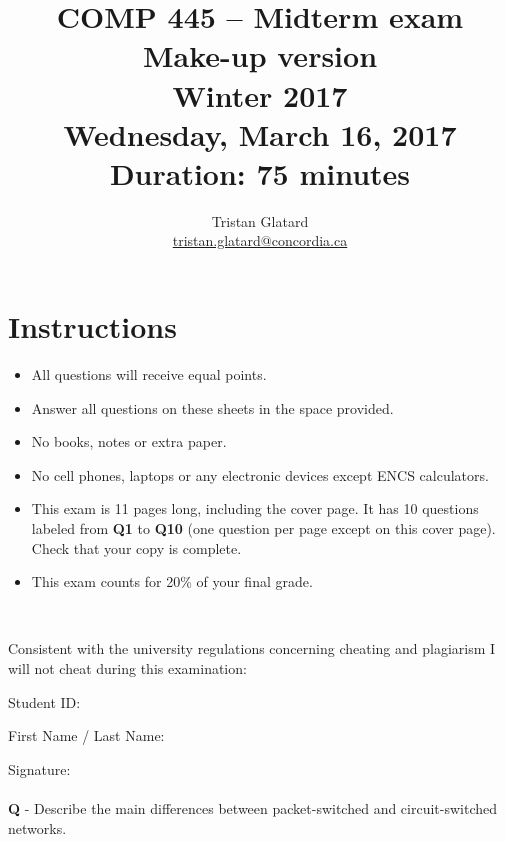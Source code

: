 \documentclass{llncs}
\title{COMP 445 -- Midterm exam \\ Make-up version \\ Winter 2017 \\ Wednesday, March 16, 2017 \\ Duration: 75 minutes}
\author{Tristan Glatard\\
  \href{mailto:tristan.glatard@concordia.ca}{tristan.glatard@concordia.ca}\\
  \vspace*{0.3cm}
  }
\institute{Concordia University\\
  Department of Computer Science and Software Engineering}
\newcounter{ques}
\newcommand{\myspace}[0]{\vspace*{0.25cm}}
\renewcommand{\question}[1]{\paragraph{}\textbf{Q\theques} - #1\stepcounter{ques} }
\newcommand{\answer}[1]{\color{red}\textit{#1}\color{black}}
\begin{document}
\maketitle

\section*{Instructions}
\begin{itemize}
\item All questions will receive equal points.
\item Answer all questions on these sheets in the space provided.
\item No books, notes or extra paper.
\item No cell phones, laptops or any electronic devices except ENCS calculators.
\item This exam is 11 pages long, including the cover page. It has 10 questions labeled from \textbf{Q1} to \textbf{Q10} (one question per page except on this cover page). Check that your copy is complete.
\item This exam counts for 20\% of your final grade.
\end{itemize}

\myspace

\myspace

\hrulefill\\

\myspace

Consistent with the university regulations concerning cheating and plagiarism I will not cheat during this examination:

\myspace

\myspace

Student ID: \dotfill

\myspace

\myspace

First Name / Last Name: \dotfill

\myspace

\myspace

Signature: \dotfill

\myspace

\myspace

\hrulefill

\newpage


\question{Describe the main differences between packet-switched and circuit-switched networks.}

\answer{}
\end{document}

